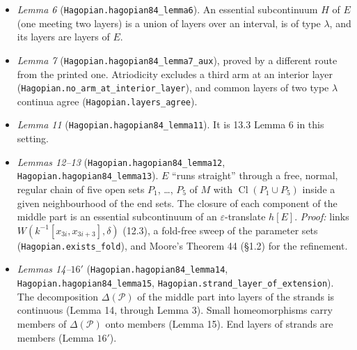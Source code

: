 \documentclass[11pt]{article}
\newcommand{\lean}[1]{\texttt{#1}}
\begin{document}
\begin{itemize}
  \item \emph{Lemma 6} (\lean{Hagopian.\hspace{0pt}hagopian84\_\hspace{0pt}lemma6}). An essential subcontinuum $H$ of $E$ (one meeting two layers) is a union of layers over an interval, is of type $\lambda$, and its layers are layers of $E$.
  \item \emph{Lemma 7} (\lean{Hagopian.\hspace{0pt}hagopian84\_\hspace{0pt}lemma7\_\hspace{0pt}aux}), proved by a different route from the printed one. Atriodicity excludes a third arm at an interior layer (\lean{Hagopian.\hspace{0pt}no\_\hspace{0pt}arm\_\hspace{0pt}at\_\hspace{0pt}interior\_\hspace{0pt}layer}), and common layers of two type $\lambda$ continua agree (\lean{Hagopian.\hspace{0pt}layers\_\hspace{0pt}agree}).
  \item \emph{Lemma 11} (\lean{Hagopian.\hspace{0pt}hagopian84\_\hspace{0pt}lemma11}). It is 13.3 Lemma 6 in this setting.
  \item \emph{Lemmas 12--13} (\lean{Hagopian.\hspace{0pt}hagopian84\_\hspace{0pt}lemma12}, \lean{Hagopian.\hspace{0pt}hagopian84\_\hspace{0pt}lemma13}). $E$ ``runs straight'' through a free, normal, regular chain of five open sets $P_1$, \dots{}, $P_5$ of $M$ with $\operatorname{Cl} (P_1 \cup P_5)$ inside a given neighbourhood of the end sets. The closure of each component of the middle part is an essential subcontinuum of an $\varepsilon$-translate $h[E]$. \emph{Proof:} links $W(k^{-1}[x_{3i}, x_{3i+3}], \delta)$ (12.3), a fold-free sweep of the parameter sets (\lean{Hagopian.\hspace{0pt}exists\_\hspace{0pt}fold}), and Moore's Theorem 44 (\S{}1.2) for the refinement.
  \item \emph{Lemmas 14--$16'$} (\lean{Hagopian.\hspace{0pt}hagopian84\_\hspace{0pt}lemma14}, \lean{Hagopian.\hspace{0pt}hagopian84\_\hspace{0pt}lemma15}, \lean{Hagopian.\hspace{0pt}strand\_\hspace{0pt}layer\_\hspace{0pt}of\_\hspace{0pt}extension}). The decomposition $\Delta (\mathcal{P})$ of the middle part into layers of the strands is continuous (Lemma 14, through Lemma 3). Small homeomorphisms carry members of $\Delta (\mathcal{P})$ onto members (Lemma 15). End layers of strands are members (Lemma $16'$).

\end{itemize}
\end{document}
